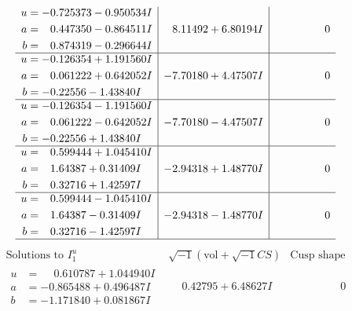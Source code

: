 \documentclass[1p]{elsarticle_modified}
\theoremstyle{definition}
\newcommand{\I}{\sqrt{-1}}
\begin{document}
$$\begin{array}{c|c|c}
\begin{aligned}
u &= -0.725373 - 0.950534 I \\
a &= \phantom{-}0.447350 - 0.864511 I \\
b &= \phantom{-}0.874319 - 0.296644 I\end{aligned}
 & \phantom{-}8.11492 + 6.80194 I & \phantom{-0.000000 } 0 \\ \hline\begin{aligned}
u &= -0.126354 + 1.191560 I \\
a &= \phantom{-}0.061222 + 0.642052 I \\
b &= -0.22556 - 1.43840 I\end{aligned}
 & -7.70180 + 4.47507 I & \phantom{-0.000000 } 0 \\ \hline\begin{aligned}
u &= -0.126354 - 1.191560 I \\
a &= \phantom{-}0.061222 - 0.642052 I \\
b &= -0.22556 + 1.43840 I\end{aligned}
 & -7.70180 - 4.47507 I & \phantom{-0.000000 } 0 \\ \hline\begin{aligned}
u &= \phantom{-}0.599444 + 1.045410 I \\
a &= \phantom{-}1.64387 + 0.31409 I \\
b &= \phantom{-}0.32716 + 1.42597 I\end{aligned}
 & -2.94318 + 1.48770 I & \phantom{-0.000000 } 0 \\ \hline\begin{aligned}
u &= \phantom{-}0.599444 - 1.045410 I \\
a &= \phantom{-}1.64387 - 0.31409 I \\
b &= \phantom{-}0.32716 - 1.42597 I\end{aligned}
 & -2.94318 - 1.48770 I & \phantom{-0.000000 } 0\\
 \hline 
 \end{array}$$\newpage$$\begin{array}{c|c|c}  
\text{Solutions to }I^u_{1}& \I (\text{vol} + \sqrt{-1}CS) & \text{Cusp shape}\\
 \hline 
\begin{aligned}
u &= \phantom{-}0.610787 + 1.044940 I \\
a &= -0.865488 + 0.496487 I \\
b &= -1.171840 + 0.081867 I\end{aligned}
 & \phantom{-}0.42795 + 6.48627 I & \phantom{-0.000000 } 0 \\ \hline\begin{aligned}

\end{aligned}
\end{array}$$
\end{document}
